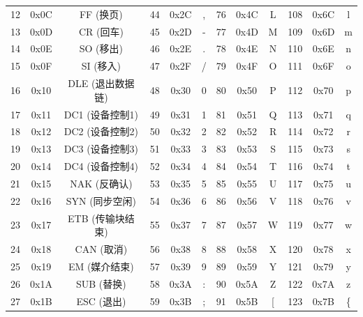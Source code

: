 \documentclass[a4paper, twoside]{article}
\begin{document}
\begin{table}[h]
\begin{tabular}{|c c c|c c c|c c c|c c c|}
            12  & 0x0C & FF (换页)         & 44  & 0x2C & ,          & 76  & 0x4C & L           & 108  & 0x6C & l            \\
            13  & 0x0D & CR (回车)         & 45  & 0x2D & -          & 77  & 0x4D & M           & 109  & 0x6D & m            \\
            14  & 0x0E & SO (移出)         & 46  & 0x2E & .          & 78  & 0x4E & N           & 110  & 0x6E & n            \\
            15  & 0x0F & SI (移入)         & 47  & 0x2F & /          & 79  & 0x4F & O           & 111  & 0x6F & o            \\
            16  & 0x10 & DLE (退出数据链)  & 48  & 0x30 & 0          & 80  & 0x50 & P           & 112  & 0x70 & p            \\
            17  & 0x11 & DC1 (设备控制1)   & 49  & 0x31 & 1          & 81  & 0x51 & Q           & 113  & 0x71 & q            \\
            18  & 0x12 & DC2 (设备控制2)   & 50  & 0x32 & 2          & 82  & 0x52 & R           & 114  & 0x72 & r            \\
            19  & 0x13 & DC3 (设备控制3)   & 51  & 0x33 & 3          & 83  & 0x53 & S           & 115  & 0x73 & s            \\
            20  & 0x14 & DC4 (设备控制4)   & 52  & 0x34 & 4          & 84  & 0x54 & T           & 116  & 0x74 & t            \\
            21  & 0x15 & NAK (反确认)      & 53  & 0x35 & 5          & 85  & 0x55 & U           & 117  & 0x75 & u            \\
            22  & 0x16 & SYN (同步空闲)    & 54  & 0x36 & 6          & 86  & 0x56 & V           & 118  & 0x76 & v            \\
            23  & 0x17 & ETB (传输块结束)  & 55  & 0x37 & 7          & 87  & 0x57 & W           & 119  & 0x77 & w            \\
            24  & 0x18 & CAN (取消)        & 56  & 0x38 & 8          & 88  & 0x58 & X           & 120  & 0x78 & x            \\
            25  & 0x19 & EM (媒介结束)     & 57  & 0x39 & 9          & 89  & 0x59 & Y           & 121  & 0x79 & y            \\
            26  & 0x1A & SUB (替换)        & 58  & 0x3A & :          & 90  & 0x5A & Z           & 122  & 0x7A & z            \\
            27  & 0x1B & ESC (退出)        & 59  & 0x3B & ;          & 91  & 0x5B & [           & 123  & 0x7B & \{           \\

\end{tabular}
\end{table}
\end{document}
